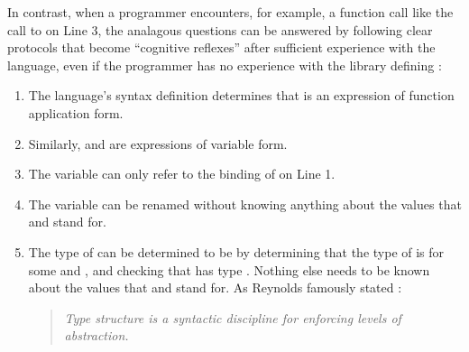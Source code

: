 
In contrast, when a programmer encounters, for example, a function call like the call to  on Line 3, the analagous questions can be answered by following clear protocols that become ``cognitive reflexes'' after sufficient experience with the language, even if the programmer has no experience with the library defining :
\begin{enumerate}
\item The language's syntax definition determines that  is an expression of function application form.
\item Similarly,  and  are expressions of variable form.
\item The variable  can only refer to the binding of  on Line 1.
\item The variable  can be renamed without knowing anything about the values that  and  stand for.
\item The type of  can be determined to be  by determining that the type of  is  for some  and , and checking that  has type . Nothing else needs to be known about the values that  and  stand for. As Reynolds famously stated \cite{B304}:
\begin{quote}
\emph{Type structure is a syntactic discipline for enforcing levels of abstraction.}
\end{quote}
\end{enumerate}


